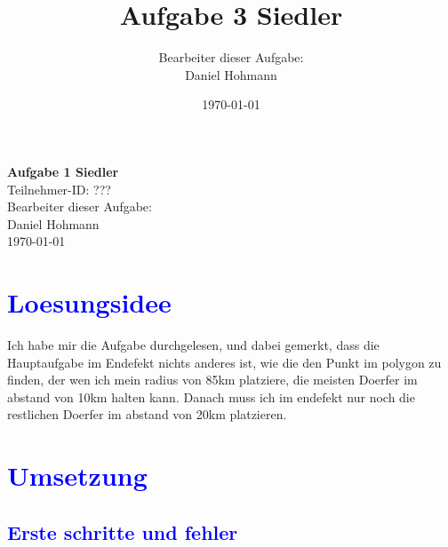 \documentclass{article}
\title{\Huge{\textbf{Aufgabe 3 Siedler}} \\ \centering{\LARGE{Teilnahme-ID: ?????}}}
\author{Bearbeiter dieser Aufgabe: \\ Daniel Hohmann}
\date{\today}
\begin{document}
\thispagestyle{empty}
\begin{center}
\Huge{\textbf{Aufgabe 1 Siedler}}
\\
\LARGE{Teilnehmer-ID: ???}
\\
\LARGE{Bearbeiter dieser Aufgabe: \\ Daniel Hohmann}
\\
\LARGE{\today}
\end{center}
\newpage
\setcounter{page}{1}
\tableofcontents
\newpage
\section{\textcolor{blue}{Loesungsidee}}
\begin{center}
Ich habe mir die Aufgabe durchgelesen, und dabei gemerkt, dass die Hauptaufgabe im Endefekt nichts anderes ist, wie die den Punkt im polygon zu finden, der wen ich mein radius von 85km platziere, die meisten Doerfer im abstand von 10km halten kann. Danach muss ich im endefekt nur noch die restlichen Doerfer im abstand von 20km platzieren.
\end{center}
\section{\textcolor{blue}{Umsetzung}}
\subsection{\textcolor{blue}{Erste schritte und fehler}}
\end{document}
